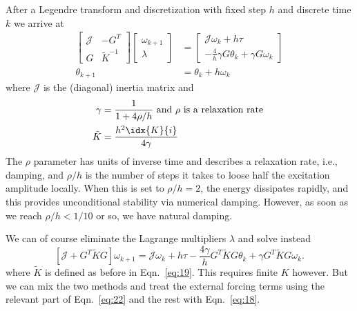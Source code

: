 \documentclass[10pt,notitlepage,abstracton]{scrartcl}
\theoremstyle{plain}
\theoremstyle{plain}
\theoremstyle{plain}
\begin{document}
After a Legendre transform and discretization with fixed step $h$ and
discrete time $k$ we arrive at 
\begin{equation}
  \label{eq:18}
  \begin{split}
    \begin{bmatrix}
      \mathcal{J} & -G^{T} \\
      G & \tilde{K}^{-1}
    \end{bmatrix}
    \begin{bmatrix}
      \omega_{k+1} \\
      \lambda
    \end{bmatrix}
    &=
    \begin{bmatrix}
      \mathcal{J}\omega_{k} + h\tau \\
      -\frac{4}{h}\gamma G\theta_{k}  + \gamma G\omega_{k}
    \end{bmatrix} \\
    \theta_{k+1} &= \theta_{k} + h\omega_{k}
  \end{split}
\end{equation}
where $\mathcal{J}$ is the (diagonal) inertia matrix and 
\begin{equation}
  \label{eq:19}
  \begin{split}
    \gamma &= \frac{1}{1 + 4 \rho / h } \text{ and $\rho$ is a relaxation
      rate } \\
    \tilde{K} & = \frac{h^{2}\idx{K}{i}}{4\gamma}
  \end{split}
\end{equation}
The $\rho$ parameter has units of inverse time and describes a relaxation
rate, i.e., damping, and $\rho/h$ is the number of steps it takes to loose
half the excitation amplitude locally.  When this is set to $\rho/h= 2$,
the energy dissipates rapidly, and this provides unconditional stability
via numerical damping.
However, as soon as we reach $\rho/h < 1/10$ or so, we have natural
damping.  

We can of course eliminate the Lagrange multipliers $\lambda$ and solve
instead 
\begin{equation}
  \label{eq:22}
  \left[ \mathcal{J} + G^{T}\tilde{K}G \right]\omega_{k+1} =
  \mathcal{J}\omega_{k} + h\tau -
  \frac{4\gamma}{h}G^{T}\tilde{K}G\theta_{k} + \gamma G^{T}\tilde{K}G\omega_{k}. 
\end{equation}
where $\tilde{K}$ is defined as before in Eqn.~\eqref{eq:19}.  This
requires finite $K$ however.  But we can mix the two methods and treat the
external forcing terms using the relevant part of Eqn.~\eqref{eq:22} and
the rest with Eqn.~\eqref{eq:18}.  
\end{document}
